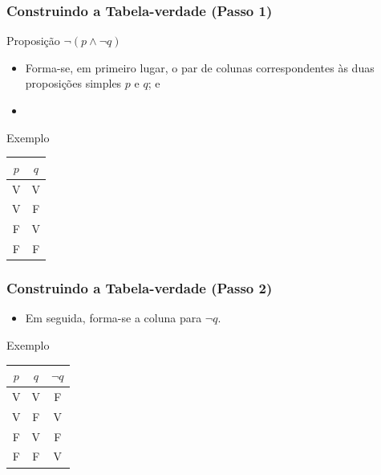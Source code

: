 \documentclass[aspectratio=169]{beamer} %
\begin{document}
\begin{frame}
\frametitle{Construindo a Tabela-verdade (Passo 1)}

\begin{exampleblock}{Proposição}
$\neg (p \wedge \neg q)$
\end{exampleblock}\vfill

\begin{itemize}
	\item Forma-se, em primeiro lugar, o par de colunas correspondentes às duas proposições simples $p$ e $q$; e
	\item {}
\end{itemize}\vfill

\begin{exampleblock}{Exemplo}
\center
\begin{tabular}{|c|c|}
	\hline
	$p$ & $q$ \\ \hline
	V & V  \\ \hline
	V & F  \\ \hline
	F & V  \\ \hline
	F & F  \\ \hline
\end{tabular}
\end{exampleblock}
\end{frame}

\begin{frame}
\frametitle{Construindo a Tabela-verdade (Passo 2)}

\begin{itemize}
	\item Em seguida, forma-se a coluna para $\neg q$.
\end{itemize}\vfill

\begin{exampleblock}{Exemplo}
	\center
	\begin{tabular}{|c|c|c|}
		\hline
		$p$ & $q$ & $\neg q$ \\ \hline
		V & V  & F \\ \hline
		V & F  & V \\ \hline
		F & V  & F \\ \hline
		F & F  & V \\ \hline
	\end{tabular}
\end{exampleblock}
\end{frame}
\end{document}
